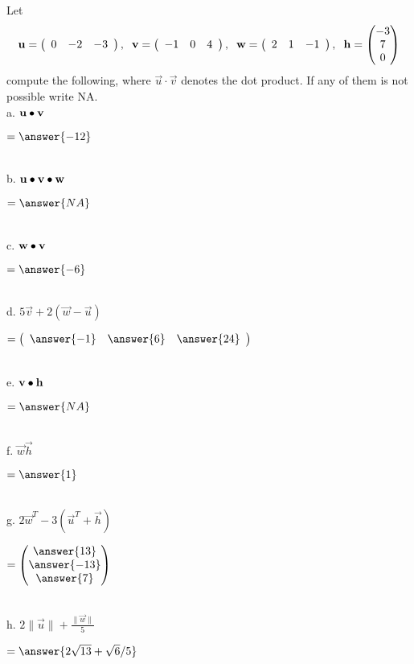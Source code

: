 \documentclass{ximera}
\author{Parisa Fatheddin}
\begin{document}
\begin{exercise}


Let
\begin{equation*}
\vec{u} = \left(\begin{array}{ccc}
0 & -2& -3
\end{array}\right), \hspace{.2cm} \vec{v} = \left(\begin{array}{ccc} -1 & 0 & 4\end{array}\right), \hspace{.2cm} \vec{w} = \left(\begin{array}{ccc} 2 & 1 & -1 \end{array}\right), \hspace{.2cm} \vec{h} = \begin{pmatrix} -3\\
7\\
0
\end{pmatrix}
\end{equation*}
compute the following, where $\vec{u}\cdot \vec{v}$ denotes the dot product. If any of them is not possible write NA. \\

a. $\vec{u}\dotp \vec{v}$ \begin{prompt}$= \answer{-12}$\end{prompt}\\

b. $\vec{u}\dotp \vec{v} \dotp\vec{w} $\begin{prompt} $= \answer{NA}$\end{prompt}\\

c. $\vec{w}\dotp \vec{v} $\begin{prompt} $=\answer{-6}$\end{prompt}\\

d. $5 \vec{v} + 2\left(\vec{w}-\vec{u}\right)$ \begin{prompt} $= \left(\begin{array}{ccc} \answer{-1} & \answer{6} & \answer{24}
\end{array}\right)$ \end{prompt}\\

e. $\vec{v} \dotp \vec{h}$ \begin{prompt}$= \answer{NA}$\end{prompt}\\

f. $\vec{w}\vec{h}$ \begin{prompt} $= \answer{1}$\end{prompt}\\

g. $2 \vec{w}^{T} - 3\left(\vec{u}^{T} + \vec{h}\right)$\begin{prompt}$= \begin{pmatrix} \answer{13} \\
\answer{-13}\\
\answer{7}
\end{pmatrix}$\end{prompt}\\

h. $2 \|\vec{u}\| + \frac{\|\vec{w}\|}{5} $\begin{prompt} $= \answer{2\sqrt{13} + \sqrt{6}/5}$\end{prompt}
\end{exercise}
\end{document}
